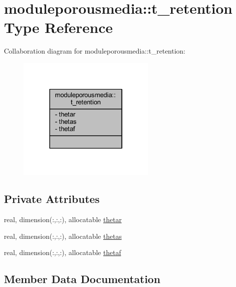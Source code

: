 \hypertarget{structmoduleporousmedia_1_1t__retention}{}\section{moduleporousmedia\+:\+:t\+\_\+retention Type Reference}
\label{structmoduleporousmedia_1_1t__retention}


Collaboration diagram for moduleporousmedia\+:\+:t\+\_\+retention\+:\nopagebreak
\begin{figure}[H]
\begin{center}
\leavevmode
\includegraphics[width=190pt]{structmoduleporousmedia_1_1t__retention__coll__graph}
\end{center}
\end{figure}
\subsection*{Private Attributes}
\begin{DoxyCompactItemize}
\item 
real, dimension(\+:,\+:,\+:), allocatable \mbox{\hyperlink{structmoduleporousmedia_1_1t__retention_a259033001dcf1b835194f2fc00ae9884}{thetar}}
\item 
real, dimension(\+:,\+:,\+:), allocatable \mbox{\hyperlink{structmoduleporousmedia_1_1t__retention_ad5b1b299783fe28efd3f602d0dc8d5f4}{thetas}}
\item 
real, dimension(\+:,\+:,\+:), allocatable \mbox{\hyperlink{structmoduleporousmedia_1_1t__retention_a7eaac9b23367b5c541ce33e800e4a1df}{thetaf}}
\end{DoxyCompactItemize}


\subsection{Member Data Documentation}
\mbox{\label{structmoduleporousmedia_1_1t__retention_a7eaac9b23367b5c541ce33e800e4a1df}} 
